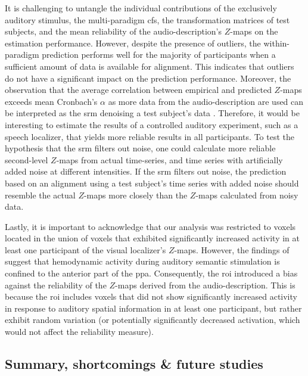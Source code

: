 %
It is challenging to untangle the individual contributions of the exclusively
auditory stimulus, the multi-paradigm \ac{cfs}, the transformation matrices of
test subjects, and the mean reliability of the audio-description's $Z$-maps on
the estimation performance.
%
However, despite the presence of outliers, the within-paradigm prediction
performs well for the majority of participants when a sufficient amount of data
is available for alignment.
%
This indicates that outliers do not have a significant impact on the prediction
performance.
%
Moreover, the observation that the average correlation between empirical and
predicted $Z$-maps exceeds mean Cronbach's $\alpha$ as more data from the
audio-description are used can be interpreted as the \ac{srm} denoising a test
subject's data \citep[cf.][]{chen2015reduced}.
%
Therefore, it would be interesting to estimate the results of a controlled
auditory experiment, such as a speech localizer, that yields more reliable
results in all participants.
%
To test the hypothesis that the \ac{srm} filters out noise, one could calculate
more reliable second-level $Z$-maps from actual time-series, and time series
with artificially added noise at different intensities.
%
If the \ac{srm} filters out noise, the prediction based on an alignment using a
test subject's time series with added noise should resemble the actual $Z$-maps
more closely than the $Z$-maps calculated from noisy data.

%
Lastly, it is important to acknowledge that our analysis was restricted to
voxels located in the union of voxels that exhibited significantly increased
activity in at least one participant of the visual localizer's $Z$-maps.
%
However, the findings of \citet{haeusler2022processing} suggest that hemodynamic
activity during auditory semantic stimulation is confined to the anterior part
of the \ac{ppa}.
%
Consequently, the \ac{roi} introduced a bias against the reliability of the
$Z$-maps derived from the audio-description.
%
This is because the \ac{roi} includes voxels that did not show significantly
increased activity in response to auditory spatial information in at least one
participant, but rather exhibit random variation (or potentially significantly
decreased activation, which would not affect the reliability measure).


\subsection{Summary, shortcomings \& future studies}

